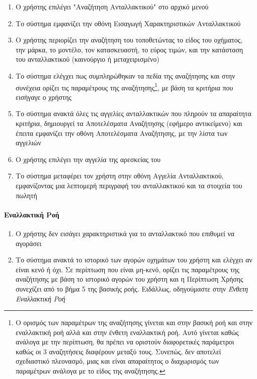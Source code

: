 \documentclass{../ol-softwaremanual}
\begin{document}
	\begin{enumerate}
		\item Ο χρήστης επιλέγει \en"\gr Αναζήτηση Ανταλλακτικού\en" \gr στο αρχικό μενού
		\item Το σύστημα εμφανίζει την οθόνη Εισαγωγή Χαρακτηριστικών Ανταλλακτικού
		\item Ο χρήστης περιορίζει την αναζήτηση του τοποθετώντας το είδος του οχήματος, την μάρκα, το μοντέλο, τον κατασκευαστή, το εύρος τιμών, και την κατάσταση του ανταλλακτικού (καινούργιο ή μεταχειρισμένο) 
		\item Το σύστημα ελέγχει πως συμπληρώθηκαν τα πεδία της αναζήτησης και στην συνέχεια ορίζει τις παραμέτρους της αναζήτησης\footnote[1]{Ο ορισμός των παραμέτρων της αναζήτησης γίνεται και στην βασική ροή και στην εναλλακτική ροή αλλά και στην ένθετη εναλλακτική ροή. Αυτό γίνεται καθώς ανάλογα με την περίπτωση, θα πρέπει να οριστούν διαφορετικές παράμετροι καθώς οι 3 αναζητήσεις διαφέρουν μεταξύ τους. Συνεπώς, δεν αποτελεί σχεδιαστικό πλεονασμό, μιας και είναι απαραίτητος ο διαχωρισμός των παραμέτρων ανάλογα με το είδος της αναζήτησης.}, με βάση τα κριτήρια που εισήγαγε ο χρήστης
		\item Το σύστημα ανακτά όλες τις αγγελίες ανταλλακτικών που πληρούν τα απαραίτητα κριτήρια, δημιουργεί τα Αποτελέσματα Αναζήτησης (εφήμερο αντικείμενο) και έπειτα εμφανίζει την οθόνη Αποτελέσματα Αναζήτησης, με την λίστα των αγγελιών
		\item Ο χρήστης επιλέγει την αγγελία της αρεσκείας του
		\item Το σύστημα μεταφέρει τον χρήστη στην οθόνη Αγγελία Ανταλλακτικού, εμφανίζοντας μια λεπτομερή περιγραφή του ανταλλακτικού και τα στοιχεία του πωλητή		
	\end{enumerate}
	
	\paragraph{Εναλλακτική Ροή}
	
	\begin{enumerate}
		\item Ο χρήστης δεν εισάγει χαρακτηριστικά για το ανταλλακτικό που επιθυμεί να αγοράσει
		\item Το σύστημα ανακτά το ιστορικό των αγορών οχημάτων του χρήστη και ελέγχει αν είναι κενό ή όχι. Σε περίπτωση που είναι μη-κενό, ορίζει τις παραμέτρους της αναζήτησης με βάση το ιστορικό αγορών του χρήστη και η Περίπτωση Χρήσης συνεχίζει από το βήμα 5 της βασικής ροής. Ειδάλλως, οδηγούμαστε στην \textit{Ένθετη Εναλλακτική Ροή}
		
	\end{enumerate}
	
\end{document}

